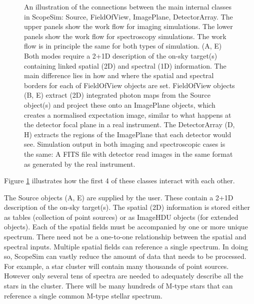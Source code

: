 \begin{figure}
\noindent{}\label{fig-workflow}

\caption{An illustration of the connections between the main internal classes in ScopeSim: Source, FieldOfView, ImagePlane, DetectorArray.
The upper panels show the work flow for imaging simulations.
The lower panels show the work flow for spectroscopy simulations.
The work flow is in principle the same for both types of simulation.
(A, E) Both modes require a 2+1D description of the on-sky target(s) containing linked spatial (2D) and spectral (1D) information.
The main difference lies in how and where the spatial and spectral borders for each of FieldOfView objects are set.
FieldOfView objects (B, E) extract (2D) integrated photon maps from the Source object(s) and project these onto an ImagePlane objects, which creates a normalised expectation image, similar to what happens at the detector focal plane in a real instrument.
The DetectorArray (D, H) extracts the regions of the ImagePlane that each detector would see.
Simulation output in both imaging and spectroscopic cases is the same: A FITS file with detector read images in the same format as generated by the real instrument.}
\end{figure}

Figure \ref{fig-workflow} illustrates how the first 4 of these classes interact with each other.

The Source objects (A, E) are supplied by the user.
These contain a 2+1D description of the on-sky target(s).
The spatial (2D) information is stored either as tables (collection of point sources) or as ImageHDU objects (for extended objects).
Each of the spatial \textquotedbl{}fields\textquotedbl{} must be accompanied by one or more unique spectrum.
There need not be a one-to-one relationship between the spatial and spectral inputs.
Multiple spatial fields can reference a single spectrum.
In doing so, ScopeSim can vastly reduce the amount of data that needs to be processed.
For example, a star cluster will contain many thousands of point sources.
However only several tens of spectra are needed to adequately describe all the stars in the cluster.
There will be many hundreds of M-type stars that can reference a single common M-type stellar spectrum.

